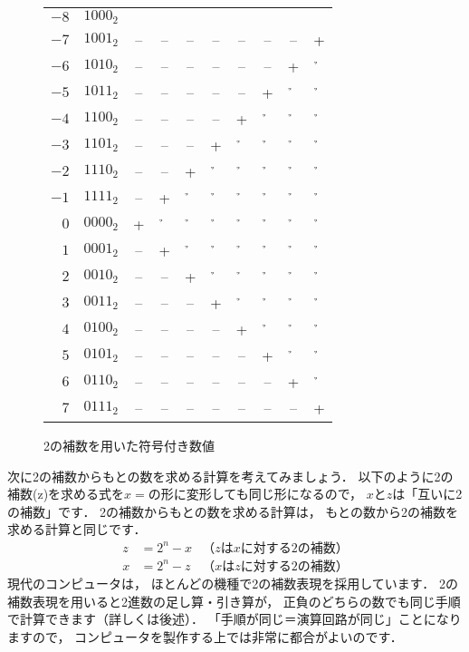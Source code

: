 \begin{figure}[tb]
\begin{center}
{\small\begin{tabular}{ r l c c c c c c c c }
$-8$  & $1000_2$ &  &  &  &  &  &  &  &  \\
$-7$  & $1001_2$ &--&--&--&--&--&--&--&+ \\
$-6$  & $1010_2$ &--&--&--&--&--&--&+ &\h\\
$-5$  & $1011_2$ &--&--&--&--&--&+ &\h&\h\\
$-4$  & $1100_2$ &--&--&--&--&+ &\h&\h&\h\\
$-3$  & $1101_2$ &--&--&--&+ &\h&\h&\h&\h\\
$-2$  & $1110_2$ &--&--&+ &\h&\h&\h&\h&\h\\
$-1$  & $1111_2$ &--&+ &\h&\h&\h&\h&\h&\h\\
$ 0$  & $0000_2$ &+ &\h&\h&\h&\h&\h&\h&\h\\
$ 1$  & $0001_2$ &--&+ &\h&\h&\h&\h&\h&\h\\
$ 2$  & $0010_2$ &--&--&+ &\h&\h&\h&\h&\h\\
$ 3$  & $0011_2$ &--&--&--&+ &\h&\h&\h&\h\\
$ 4$  & $0100_2$ &--&--&--&--&+ &\h&\h&\h\\
$ 5$  & $0101_2$ &--&--&--&--&--&+ &\h&\h\\
$ 6$  & $0110_2$ &--&--&--&--&--&--&+ &\h\\
$ 7$  & $0111_2$ &--&--&--&--&--&--&--&+ \\
\end{tabular}}
\caption{2の補数を用いた符号付き数値}
\label{fig:chap2:2sc}
\end{center}
\end{figure}

次に2の補数からもとの数を求める計算を考えてみましょう．
以下のように2の補数(z)を求める式を$x=$の形に変形しても同じ形になるので，
$x$と$z$は「互いに2の補数」です．
2の補数からもとの数を求める計算は，
もとの数から2の補数を求める計算と同じです．
{\small\begin{align*}
z &= 2^n - x &（zはxに対する2の補数） \\
x &= 2^n - z &（xはzに対する2の補数）
\end{align*}}
現代のコンピュータは，
ほとんどの機種で2の補数表現を採用しています．
2の補数表現を用いると2進数の足し算・引き算が，
正負のどちらの数でも同じ手順で計算できます（詳しくは後述）．
「手順が同じ＝演算回路が同じ」ことになりますので，
コンピュータを製作する上では非常に都合がよいのです．


